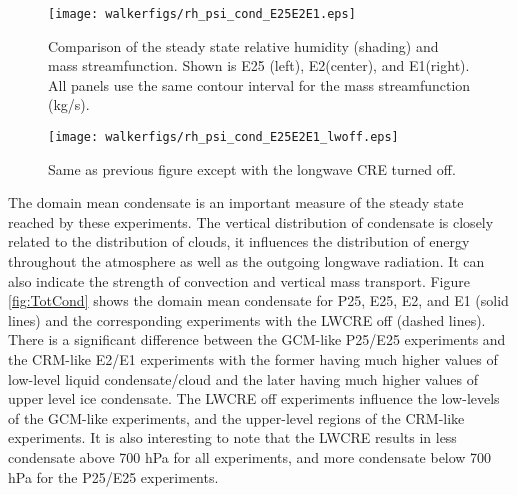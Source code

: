 \documentclass[11pt]{article}   	%
\begin{document}
\begin{figure}
  \centering
      \texttt{[image: walkerfigs/rh\_psi\_cond\_E25E2E1.eps]}
      \caption{Comparison of the steady state relative humidity (shading) and mass streamfunction.  
      Shown is E25 (left), E2(center), and E1(right).  All panels use the same contour interval for the 
      mass streamfunction (kg/s).}
  \label{fig:rh_psi_P25E2E1}
\end{figure}

\begin{figure}
  \centering
      \texttt{[image: walkerfigs/rh\_psi\_cond\_E25E2E1\_lwoff.eps]}
      \caption{Same as previous figure except with the longwave CRE turned off.}
  \label{fig:rh_psi_P25E2E1_lwoff}
\end{figure}


The domain mean condensate is an important measure of the steady state reached by these experiments.  The vertical 
distribution of condensate is closely related to the distribution of clouds, it influences the distribution of energy throughout
the atmosphere as well as the outgoing longwave radiation.  It can also indicate the strength of convection 
and vertical mass transport.     Figure \ref{fig:TotCond} shows the domain mean condensate for P25, E25, E2, and E1
(solid lines) and the corresponding experiments with the LWCRE off (dashed lines).  There is a significant difference 
between the GCM-like P25/E25 experiments and the CRM-like E2/E1 experiments with the former having much 
higher values of low-level liquid condensate/cloud and the later having much higher values of upper level ice 
condensate.  The LWCRE off experiments influence the low-levels of the GCM-like experiments, and the upper-level
regions of the CRM-like experiments.     It is also interesting to note that the LWCRE results in less condensate 
above 700 hPa for all experiments, and more condensate below 700 hPa for the P25/E25 experiments.  
\end{document}
